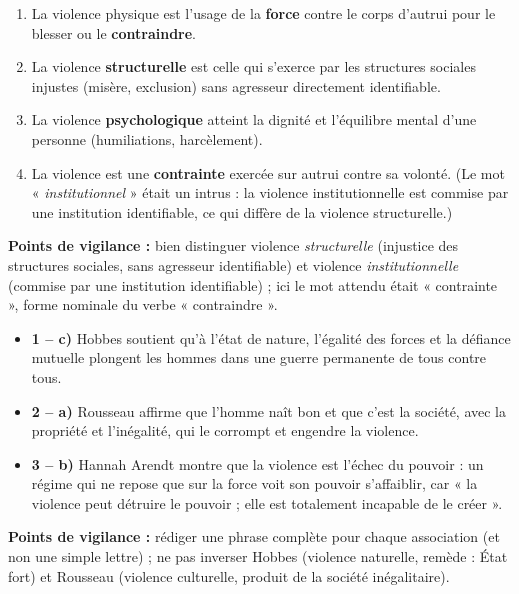 \documentclass[11pt]{article}
\newcommand{\cle}[1]{{\popxbold\color{popdark}#1}}
\begin{document}
\begin{corrige}
\begin{enumerate}
\item La \cle{violence physique} est l'usage de la \textbf{force} contre le corps d'autrui pour le blesser ou le \textbf{contraindre}.
\item La violence \textbf{structurelle} est celle qui s'exerce par les structures sociales injustes (misère, exclusion) sans agresseur directement identifiable.
\item La violence \textbf{psychologique} atteint la dignité et l'équilibre mental d'une personne (humiliations, harcèlement).
\item La violence est une \textbf{contrainte} exercée sur autrui contre sa volonté. (Le mot « \emph{institutionnel} » était un intrus : la violence institutionnelle est commise par une institution identifiable, ce qui diffère de la violence structurelle.)
\end{enumerate}
\textbf{Points de vigilance :} bien distinguer violence \emph{structurelle} (injustice des structures sociales, sans agresseur identifiable) et violence \emph{institutionnelle} (commise par une institution identifiable) ; ici le mot attendu était « contrainte », forme nominale du verbe « contraindre ».
\end{corrige}

\begin{corrige}
\begin{itemize}
\item \textbf{1 -- c)} Hobbes soutient qu'à l'état de nature, l'égalité des forces et la défiance mutuelle plongent les hommes dans une guerre permanente de tous contre tous.
\item \textbf{2 -- a)} Rousseau affirme que l'homme naît bon et que c'est la société, avec la propriété et l'inégalité, qui le corrompt et engendre la violence.
\item \textbf{3 -- b)} Hannah Arendt montre que la violence est l'échec du pouvoir : un régime qui ne repose que sur la force voit son pouvoir s'affaiblir, car « la violence peut détruire le pouvoir ; elle est totalement incapable de le créer ».
\end{itemize}
\textbf{Points de vigilance :} rédiger une phrase complète pour chaque association (et non une simple lettre) ; ne pas inverser Hobbes (violence naturelle, remède : État fort) et Rousseau (violence culturelle, produit de la société inégalitaire).
\end{corrige}
\end{document}

